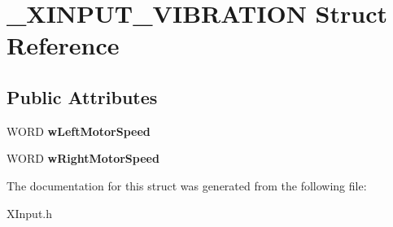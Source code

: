 \hypertarget{struct___x_i_n_p_u_t___v_i_b_r_a_t_i_o_n}{}\section{\+\_\+\+X\+I\+N\+P\+U\+T\+\_\+\+V\+I\+B\+R\+A\+T\+I\+O\+N Struct Reference}
\label{struct___x_i_n_p_u_t___v_i_b_r_a_t_i_o_n}
\subsection*{Public Attributes}
\begin{DoxyCompactItemize}
\item 
\hypertarget{struct___x_i_n_p_u_t___v_i_b_r_a_t_i_o_n_a6ce4ae9b5c5ac18dc476f7e5098e0661}{}W\+O\+R\+D {\bfseries w\+Left\+Motor\+Speed}\label{struct___x_i_n_p_u_t___v_i_b_r_a_t_i_o_n_a6ce4ae9b5c5ac18dc476f7e5098e0661}

\item 
\hypertarget{struct___x_i_n_p_u_t___v_i_b_r_a_t_i_o_n_a0e06981a411d51f7b107863f8d92bfcb}{}W\+O\+R\+D {\bfseries w\+Right\+Motor\+Speed}\label{struct___x_i_n_p_u_t___v_i_b_r_a_t_i_o_n_a0e06981a411d51f7b107863f8d92bfcb}

\end{DoxyCompactItemize}


The documentation for this struct was generated from the following file\+:\begin{DoxyCompactItemize}
\item 
X\+Input.\+h\end{DoxyCompactItemize}
